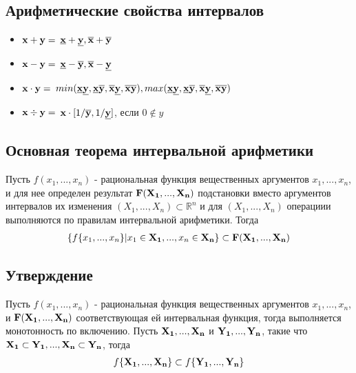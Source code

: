 \documentclass{article}
\begin{document}
    \subsection{Арифметические свойства интервалов}
    \begin{itemize}

        \item {$\bold{x} + \bold{y} =$ {${\bold{\underline{x}} + \bold{\underline{y}},  \bold{\overline{x}} + \bold{\overline{y}}}$}}

        \item {$\bold{x} - \bold{y} =$ {${\bold{\underline{x}} - \bold{\overline{y}},  \bold{\overline{x}} - \bold{\underline{y}}}$}}

        \item {$\bold{x} \cdot \bold{y} =$ {${min(\bold{\underline{x} \underline{y}}, \bold{\underline{x} \overline{y}}, \bold{\overline{x} \underline{y}}, \bold{\overline{x} \overline{y}}) , max(\bold{\underline{x} \underline{y}}, \bold{\underline{x} \overline{y}}, \bold{\overline{x} \underline{y}}, \bold{\overline{x} \overline{y}}) }$}}

        \item {$\bold{x} \div \bold{y} =$ $\bold{x} \cdot[1/\bold{\overline{y}}, 1/\bold{\underline{y}}]$, если $0 \not\in y$}

    \end{itemize}

    \subsection{Основная теорема интервальной арифметики}
    Пусть $f(x_1, ..., x_n)$ - рациональная функция вещественных аргументов $x_1, ..., x_n$, и для нее определен результат $\bold{F(X_1, ..., X_n)}$ подстановки вместо аргументов интервалов их изменения $(X_1, ..., X_n) \subset \mathbb{R}^n$ и для $(X_1, ..., X_n)$ операциии выполняются по правилам интервальной арифметики. Тогда
    \begin{gather*}
        \{f\{x_1,...,x_n\} | x_1 \in \bold{X_1},...,x_n \in \bold{X_n}\} \subset \bold{F(\bold{X_1},...,\bold{X_n}})
    \end{gather*}


    \subsection{Утверждение}

    Пусть $f(x_1, ..., x_n)$ - рациональная функция вещественных аргументов $x_1, ..., x_n$, и $\bold{F(X_1, ..., X_n)}$ соответствующая ей интервальная функция, тогда выполняется монотонность по включению.
    Пусть $\bold{X_1},...,\bold{X_n}$ и $\bold{Y_1},...,\bold{Y_n}$, такие что $\bold{X_1} \subset \bold{Y_1},...,\bold{X_n} \subset \bold{Y_n}$, тогда
    \begin{gather*}
        f\{\bold{X_1},...,\bold{X_n}\} \subset f\{\bold{Y_1},...,\bold{Y_n}\}
    \end{gather*}
\end{document}
